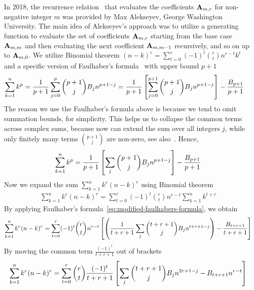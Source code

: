 In 2018, the recurrence relation~\cite{alekseyev2018mathoverflow} that evaluates the coefficients ${\mathbf{A}} \sb{m,r}$ for
non-negative integer $m$ was provided by Max Alekseyev, George Washington University.
The main idea of Alekseyev's approach was to utilize a generating function to evaluate the set of coefficients ${\mathbf{A}} \sb{m,r}$
starting from the base case ${\mathbf{A}} \sb{m,m}$ and then evaluating the next coefficient ${\mathbf{A}} \sb{m,m-1}$
recursively, and so on up to ${\mathbf{A}} \sb{m,0}$.
We utilize Binomial theorem $(n-k)^r=\sum_{t=0}^{r} (-1)^t \binom{r}{t} n^{r-t} k^t$ and a specific version
of Faulhaber's formula~\cite{beardon1996sums} with upper bound $p+1$
\begin{align*}
    \sum_{k=1}^{n} k^{p}
    = \frac{1}{p+1}\sum_{j=0}^{p} \binom{p+1}{j} {B}\sb{j} n^{p+1-j}
    &= \frac{1}{p+1} \left[ \sum_{j=0}^{p+1} \binom{p+1}{j} {B}\sb{j} n^{p+1-j} \right] - \frac{{B}\sb{p+1}}{p+1}
\end{align*}
The reason we use the Faulhaber's formula above is because we tend to omit summation bounds, for simplicity.
This helps us to collapse the common terms across complex sums, because now can extend the sum over all integers $j$,
while only finitely many terms $\binom{p+1}{j}$ are non-zero, see also~\cite[~p. 2]{knuth1992two}.
Hence,
\begin{align}
    \label{eq:modified-faulhabers-formula}
    \sum_{k=1}^{n} k^{p}
    = \frac{1}{p+1} \left[ \sum_{j} \binom{p+1}{j} {B}\sb{j} n^{p+1-j} \right] - \frac{{B}\sb{p+1}}{p+1}
\end{align}
Now we expand the sum $\sum_{k=1}^{n} k^{r} (n-k)^{r}$ using Binomial theorem
\begin{align*}
    \sum_{k=1}^{n} k^{r} (n-k)^{r} = \sum_{t=0}^{r} (-1)^t \binom{r}{t} n^{r-t} \sum_{k=1}^{n} k^{t+r}
\end{align*}
By applying Faulhaber's formula~\eqref{eq:modified-faulhabers-formula}, we obtain
\begin{align*}
    \sum_{k=1}^{n} k^{r} (n-k)^{r}
    = \sum_{t=0}^{r} (-1)^t \binom{r}{t} n^{r-t} \left[ \left( \frac{1}{t+r+1} \sum_{j} \binom{t+r+1}{j} {B}\sb{j} n^{t+r+1-j} \right) - \frac{{B}\sb{t+r+1}}{t+r+1} \right]
\end{align*}
By moving the common term $\frac{(-1)^t}{t+r+1}$ out of brackets
\begin{align*}
    \sum_{k=1}^{n} k^{r} (n-k)^{r}
    = \sum_{t=0}^{r} \binom{r}{t} \frac{(-1)^t}{t+r+1} \left[ \sum_{j} \binom{t+r+1}{j} {B}\sb{j} n^{2r+1-j} - {B}\sb{t+r+1} n^{r-t} \right]
\end{align*}
